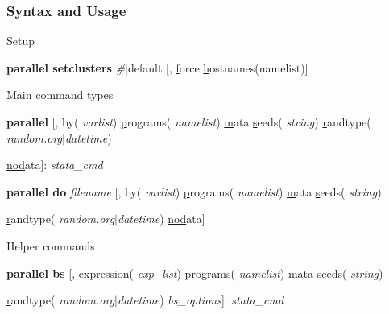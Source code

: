 \documentclass[9pt,\ExtraDocOpts]{beamer}
\begin{document}
\begin{frame}
\frametitle{Syntax and Usage}

Setup

\begin{semiverbatim}
\footnotesize
{\bf parallel setclusters} \textit{\#}|default  [, \uline{f}orce \uline{h}ostnames(namelist)] 
\end{semiverbatim}\pause{}

Main command types

\begin{semiverbatim}
\footnotesize
{\bf parallel} [, by(\textit{\color{blue} varlist}) \uline{p}rograms(\textit{\color{blue} namelist}) \uline{m}ata \uline{s}eeds(\textit{\color{blue} string}) \uline{r}andtype(\textit{\color{blue} random.org$|$datetime})

\hspace{1cm} \uline{nod}ata]:  \textit{stata\_cmd}
\end{semiverbatim}\pause{}

\begin{semiverbatim}
\footnotesize
{\bf parallel do} \textit{\color{blue} filename} [, by(\textit{\color{blue} varlist}) \uline{p}rograms(\textit{\color{blue} namelist}) \uline{m}ata \uline{s}eeds(\textit{\color{blue} string})

\hspace{1cm}  \uline{r}andtype(\textit{\color{blue} random.org$|$datetime}) \uline{nod}ata]
\end{semiverbatim}\pause{}

Helper commands

\begin{semiverbatim}
	\footnotesize
	{\bf parallel bs} [, \uline{exp}ression(\textit{\color{blue} exp\_list}) \uline{p}rograms(\textit{\color{blue} namelist}) \uline{m}ata \uline{s}eeds(\textit{\color{blue} string}) 
	
	\hspace{1cm} \uline{r}andtype(\textit{\color{blue} random.org$|$datetime}) \textit{bs\_options}]:  \textit{stata\_cmd}
\end{semiverbatim}\pause{}


\end{frame}
\end{document}
